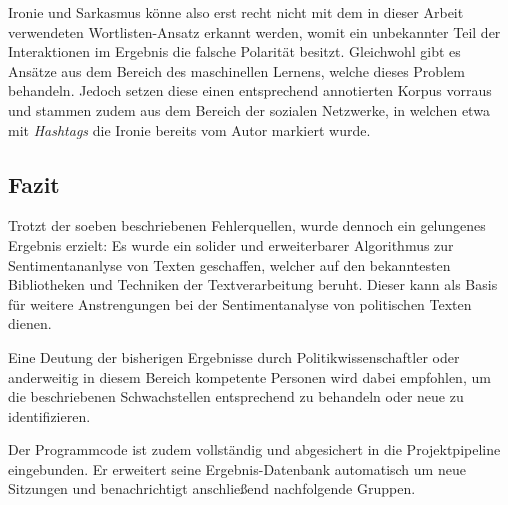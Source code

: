 Ironie und Sarkasmus könne also erst recht nicht mit dem in dieser Arbeit verwendeten Wortlisten-Ansatz erkannt werden, womit ein unbekannter Teil der Interaktionen im Ergebnis die falsche Polarität besitzt. 
Gleichwohl gibt es Ansätze aus dem Bereich des maschinellen Lernens, welche dieses Problem behandeln. 
Jedoch setzen diese einen entsprechend annotierten Korpus vorraus und stammen zudem aus dem Bereich der sozialen Netzwerke, in welchen etwa mit \textit{Hashtags} die Ironie bereits vom Autor markiert wurde. 

\subsection{Fazit}
Trotzt der soeben beschriebenen Fehlerquellen, wurde dennoch ein gelungenes Ergebnis erzielt: 
Es wurde ein solider und erweiterbarer Algorithmus zur Sentimentananlyse von Texten geschaffen, welcher auf den bekanntesten Bibliotheken und Techniken der Textverarbeitung beruht. 
Dieser kann als Basis für weitere Anstrengungen bei der Sentimentanalyse von politischen Texten dienen. 

Eine Deutung der bisherigen Ergebnisse durch Politikwissenschaftler oder anderweitig in diesem Bereich kompetente Personen wird dabei empfohlen, um die beschriebenen Schwachstellen entsprechend zu behandeln oder neue zu identifizieren. 

Der Programmcode ist zudem vollständig und abgesichert in die Projektpipeline eingebunden. 
Er erweitert seine Ergebnis-Datenbank automatisch um neue Sitzungen und benachrichtigt anschließend nachfolgende Gruppen. 
